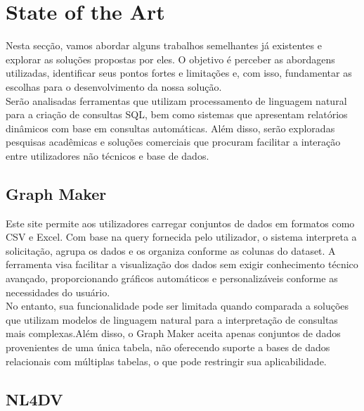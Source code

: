 \documentclass{article}
\begin{document}
\section{State of the Art}

\hspace*{1em} Nesta secção, vamos abordar alguns trabalhos semelhantes já existentes e explorar as soluções propostas por eles. O objetivo é perceber as abordagens utilizadas, identificar seus pontos fortes e limitações e, com isso, fundamentar as escolhas para o desenvolvimento da nossa solução.\\
\hspace*{1em} Serão analisadas ferramentas que utilizam processamento de linguagem natural para a criação de consultas SQL, bem como sistemas que apresentam relatórios dinâmicos com base em consultas automáticas. Além disso, serão exploradas pesquisas acadêmicas e soluções comerciais que procuram facilitar a interação entre utilizadores não técnicos e base de dados.

\subsection{Graph Maker \cite{graphmaker}}

\hspace*{1em} Este site permite aos utilizadores carregar conjuntos de dados em formatos como CSV e Excel. Com base na query fornecida pelo utilizador, o sistema interpreta a solicitação, agrupa os dados e os organiza conforme as colunas do dataset. A ferramenta visa facilitar a visualização dos dados sem exigir conhecimento técnico avançado, proporcionando gráficos automáticos e personalizáveis conforme as necessidades do usuário. \\
\hspace*{1em} No entanto, sua funcionalidade pode ser limitada quando comparada a soluções que utilizam modelos de linguagem natural para a interpretação de consultas mais complexas.Além disso, o Graph Maker aceita apenas conjuntos de dados provenientes de uma única tabela, não oferecendo suporte a bases de dados relacionais com múltiplas tabelas, o que pode restringir sua aplicabilidade.

\subsection{NL4DV \cite{mitra2022nldv}}
\end{document}
